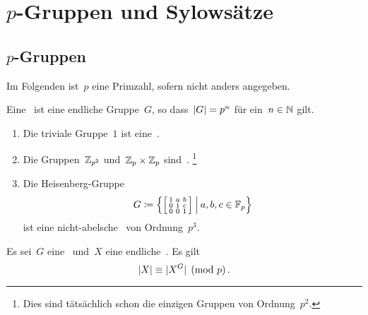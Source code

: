 \clearpage





\section{\texorpdfstring{$p$}{p}-Gruppen und Sylowsätze}



\subsection{\texorpdfstring{$p$}{p}-Gruppen}

\begin{convention}
  Im Folgenden ist~$p$ eine Primzahl, sofern nicht anders angegeben.
\end{convention}

\begin{definition}
  Eine~ ist eine endliche Gruppe~$G$, so dass~$\lvert G\rvert = p^n$ für ein~$n \in \mathbb{N}$ gilt.
\end{definition}

\begin{example}
  \leavevmode
  \begin{enumerate}
    \item
      Die triviale Gruppe~$1$ ist eine~.
    \item
      Die Gruppen~$\mathbb{Z}_{p^2}$ und~$\mathbb{Z}_p \times \mathbb{Z}_p$ sind~.%
      \footnote{
        Dies sind tätsächlich schon die einzigen Gruppen von Ordnung~$p^2$.
      }
    \item
      Die Heisenberg-Gruppe
      \[
        G
        \defined
        \left\{
          \begin{bsmallmatrix}
            1 & a & b \\
            0 & 1 & c \\
            0 & 0 & 1
          \end{bsmallmatrix}
        \suchthat*
          a, b, c \in \Finite_p
        \right\}
      \]
      ist eine nicht-abelsche~ von Ordnung~$p^3$.
  \end{enumerate}
\end{example}

\begin{proposition}
  Es sei~$G$ eine~ und~$X$ eine endliche~.
  Es gilt
  \[
    \lvert X\rvert \equiv \lvert X^G\rvert \pmod{p} \,.  
  \]
\end{proposition}

